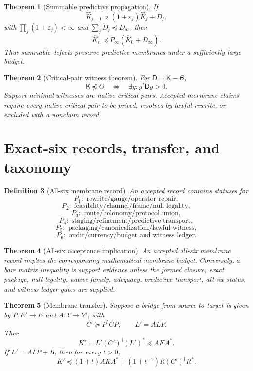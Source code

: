 \documentclass[11pt]{article}
\newtheorem{theorem}{Theorem}[section]
\newtheorem{definition}[theorem]{Definition}
\newcommand{\K}{\mathsf K}
\newcommand{\Loewner}{\preceq}
\begin{document}
\begin{theorem}[Summable predictive propagation]
If
\[
  \widehat K_{j+1}\Loewner(1+\varepsilon_j)\widehat K_j+D_j,
\]
with \(\prod_j(1+\varepsilon_j)<\infty\) and \(\sum_jD_j\Loewner D_\infty\), then
\[
  \widehat K_n\Loewner P_\infty(\widehat K_0+D_\infty).
\]
Thus summable defects preserve predictive membranes under a sufficiently large budget.
\end{theorem}

\begin{theorem}[Critical-pair witness theorem]
For \(\mathsf D=\K-\Theta\),
\[
  \K\npreceq\Theta\quad\Longleftrightarrow\quad\exists y:y^*\mathsf Dy>0.
\]
Support-minimal witnesses are native critical pairs.  Accepted membrane claims require every native critical pair to be priced, resolved by lawful rewrite, or excluded with a nonclaim record.
\end{theorem}

\section{Exact-six records, transfer, and taxonomy}

\begin{definition}[All-six membrane record]
An accepted record contains statuses for
\[
P_1:\text{ rewrite/gauge/operator repair},
\]
\[
P_2:\text{ feasibility/channel/frame/null legality},
\]
\[
P_3:\text{ route/holonomy/protocol union},
\]
\[
P_4:\text{ staging/refinement/predictive transport},
\]
\[
P_5:\text{ packaging/canonicalization/lawful witness},
\]
\[
P_6:\text{ audit/currency/budget and witness ledger}.
\]
\end{definition}

\begin{theorem}[All-six acceptance implication]
An accepted all-six membrane record implies the corresponding mathematical membrane budget.  Conversely, a bare matrix inequality is support evidence unless the formed closure, exact package, null legality, native family, adequacy, predictive transport, all-six status, and witness ledger gates are supplied.
\end{theorem}

\begin{theorem}[Membrane transfer]
Suppose a bridge from source to target is given by \(P:E'\to E\) and \(A:Y\to Y'\), with
\[
  C'\succeq P^*CP,
  \qquad
  L'=ALP.
\]
Then
\[
  K'=L'(C')^\dagger(L')^*\Loewner AK A^*.
\]
If \(L'=ALP+R\), then for every \(t>0\),
\[
  K'\Loewner(1+t)AKA^*+(1+t^{-1})R(C')^\dagger R^*.
\]
\end{theorem}
\end{document}
